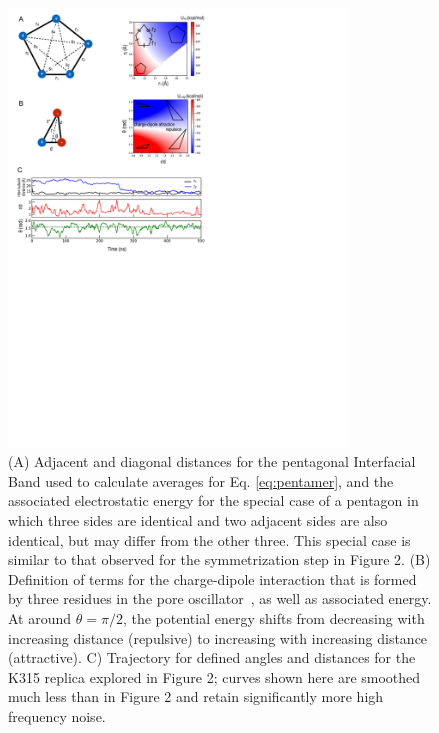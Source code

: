 \documentclass[9pt,onecolumn,oneside,lineno]{pnas-new}
\newcommand{\triad}{pore oscillator~}
\begin{document}
\begin{figure}
\begin{center}
\includegraphics[width = 0.8\textwidth]{figures_2/cartoon_energy.pdf}
\end{center}
\caption{(A) Adjacent and diagonal distances for the pentagonal Interfacial Band used to calculate averages for Eq. \ref{eq:pentamer}, and the associated electrostatic energy for the special case of a pentagon in which three sides are identical and two adjacent sides are also identical, but may differ from the other three.  This special case is similar to that observed for the symmetrization step in Figure 2.  (B) Definition of terms for the charge-dipole interaction that is formed by three residues in the \triad, as well as associated energy. At around $\theta = \pi/2$, the potential energy shifts from decreasing with increasing distance (repulsive) to increasing with increasing distance (attractive).  C) Trajectory for defined angles and distances for the K315 replica explored in Figure 2; curves shown here are smoothed much less than in Figure 2 and retain significantly more high frequency noise. }
\label{fig:cartoon_energy}
\end{figure}
\end{document}
